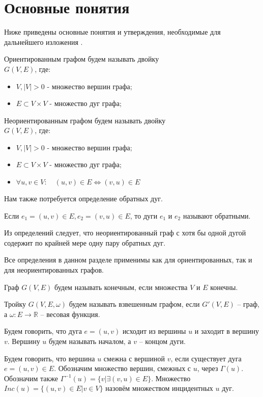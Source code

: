 \section{Основные понятия}
Ниже приведены основные понятия и утверждения, необходимые для дальнейшего изложения \cite{berzh}.

\begin{defn}
	Ориентированным графом будем называть двойку\\ $G (V, E)$, где:
	\begin{itemize}
		\item $V, |V|>0$ - множество вершин графа;
		\item $E \subset V \times V$ - множество дуг графа;
	\end{itemize}
\end{defn}
\begin{defn}
	Неориентированным графом будем называть двойку\\ $G (V, E)$, где:
	\begin{itemize}
		\item $V, |V|>0$ - множество вершин графа;
		\item $E \subset V \times V$ - множество дуг графа;
		\item $\forall u, v \in V: \quad (u, v) \in E \Leftrightarrow (v, u) \in E$
	\end{itemize}
\end{defn}

Нам также потребуется определение обратных дуг.

\begin{defn}
	Если $e_1 = (u, v) \in E, e_2 = (v, u) \in E$, то дуги $e_1$ и $e_2$ называют обратными.
\end{defn}

Из определений следует, что неориентированный граф с хотя бы одной дугой содержит по крайней мере одну пару обратных дуг.

Все определения в данном разделе применимы как для ориентированных, так и для неориентированных графов.

\begin{defn}
	Граф $G(V, E)$ будем называть конечным, если множества $V$ и $E$ конечны.
\end{defn}
\begin{defn}
	Тройку $G(V, E, \omega)$ будем называть взвешенным графом, если $G'(V, E)$ -- граф, а $\omega : E \to \mathbb{R}$ -- весовая функция.
\end{defn}
\begin{defn}
	Будем говорить, что дуга $e = (u, v)$ исходит из вершины $u$ и заходит в вершину $v$. Вершину $u$ будем называть началом, а $v$ -- концом дуги.
\end{defn} 
\begin{defn}
	Будем говорить, что вершина $u$ смежна с вершиной $v$, если существует дуга $e = (u,v) \in E$. Обозначим множество вершин, смежных с $u$, через $\Gamma(u)$. Обозначим также $\Gamma^{-1}(u) = \{v | \exists (v, u) \in E \} $. Множество $Inc(u) = \{(u, v) \in E | v \in V \}$ назовём множеством инцидентных $u$ дуг.
\end{defn} 

